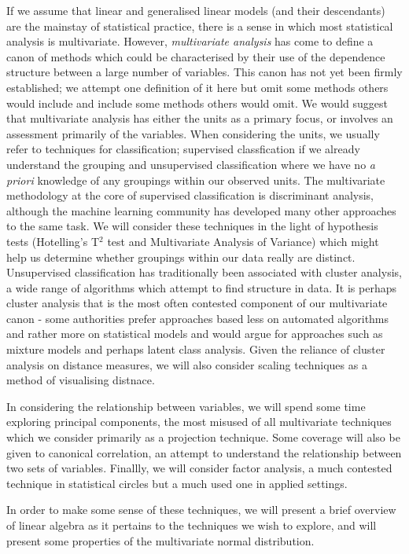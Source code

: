 If we assume that linear and generalised linear models (and their descendants) are the mainstay of statistical practice, there is a sense in which most statistical analysis is multivariate.   However, \emph{multivariate analysis} has come to define a canon of methods which could be characterised by their use of the dependence structure between a large number of variables.   This canon has not yet been firmly established; we attempt one definition of it here but omit some methods others would include and include some methods others would omit.   We would suggest that multivariate analysis has either the units as a primary focus, or involves an assessment primarily of the variables.   When considering the units, we usually refer to techniques for classification; supervised classfication if we already understand the grouping and unsupervised classification where we have no \textit{a priori} knowledge of any groupings within our observed units.   The multivariate methodology at the core of supervised classification is discriminant analysis, although the machine learning community has developed many other approaches to the same task.  We will consider these techniques in the light of hypothesis tests (Hotelling's T$^{2}$ test and Multivariate Analysis of Variance) which might help us determine whether groupings within our data really are distinct.   Unsupervised classification has traditionally been associated with cluster analysis, a wide range of algorithms which attempt to find structure in data.   It is perhaps cluster analysis that is the most often contested component of our multivariate canon - some authorities prefer approaches based less on automated algorithms and rather more on statistical models and would argue for approaches such as mixture models and perhaps latent class analysis.   Given the reliance of cluster analysis on distance measures, we will also consider scaling techniques as a method of visualising distnace.   

In considering the relationship between variables, we will spend some time exploring principal components, the most misused of all multivariate techniques which we consider primarily as a projection technique.   Some coverage will also be given to canonical correlation, an attempt to understand the relationship between two sets of variables.   Finallly, we will consider factor analysis, a much contested technique in statistical circles but a much used one in applied settings.

In order to make some sense of these techniques, we will present a brief overview of linear algebra as it pertains to the techniques we wish to explore, and will present some properties of the multivariate normal distribution.



